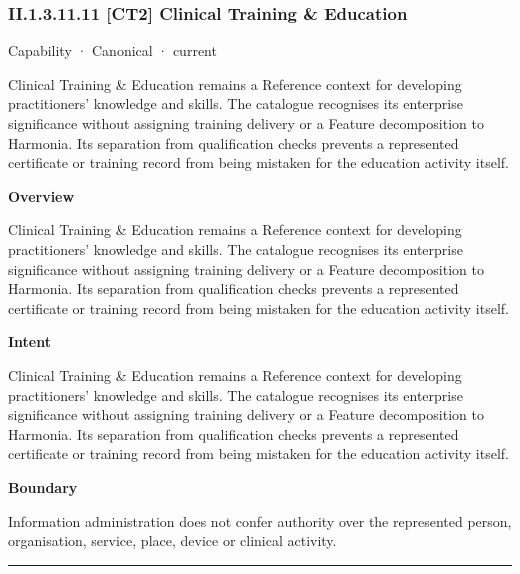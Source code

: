 \subsubsection*{II.1.3.11.11 [CT2] Clinical Training \& Education}
\label{navigation:II.1.3.11.11}

\label{element:d016f35ffbc345d99d7281e968c14ddb}
{\small Capability · Canonical · current}\par

Clinical Training \& Education remains a Reference context for developing practitioners' knowledge and skills. The catalogue recognises its enterprise significance without assigning training delivery or a Feature decomposition to Harmonia. Its separation from qualification checks prevents a represented certificate or training record from being mistaken for the education activity itself.



\textbf{Overview}



Clinical Training \& Education remains a Reference context for developing practitioners' knowledge and skills. The catalogue recognises its enterprise significance without assigning training delivery or a Feature decomposition to Harmonia. Its separation from qualification checks prevents a represented certificate or training record from being mistaken for the education activity itself.



\textbf{Intent}



Clinical Training \& Education remains a Reference context for developing practitioners' knowledge and skills. The catalogue recognises its enterprise significance without assigning training delivery or a Feature decomposition to Harmonia. Its separation from qualification checks prevents a represented certificate or training record from being mistaken for the education activity itself.



\textbf{Boundary}



Information administration does not confer authority over the represented person, organisation, service, place, device or clinical activity.



\medskip\hrule\medskip

